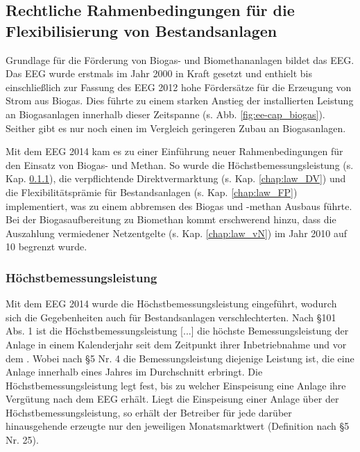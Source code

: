\subsection{Rechtliche Rahmenbedingungen für die Flexibilisierung von Bestandsanlagen}\label{chap:law_theo}

Grundlage für die Förderung von Biogas- und Biomethananlagen bildet das \gls{EEG}. Das \gls{EEG} wurde erstmals im Jahr 2000 in Kraft gesetzt und enthielt bis einschließlich zur Fassung des \gls{EEG} \SI{2012}{\relax} hohe Fördersätze für die Erzeugung von Strom aus Biogas. Dies führte zu einem starken Anstieg der installierten Leistung an Biogasanlagen innerhalb dieser Zeitspanne (s. Abb. \ref{fig:ee-cap_biogas}). Seither gibt es nur noch einen im Vergleich geringeren Zubau an Biogasanlagen. \parencite{DanielGromke2019}\smallskip

Mit dem \gls{EEG} \SI{2014}{\relax} kam es zu einer Einführung neuer Rahmenbedingungen für den Einsatz von Biogas- und Methan. So wurde die Höchstbemessungsleistung (s. Kap. \ref{chap:law_Bem}), die verpflichtende Direktvermarktung (s. Kap. \ref{chap:law_DV}) und die Flexibilitätsprämie für Bestandsanlagen (s. Kap. \ref{chap:law_FP}) implementiert, was zu einem abbremsen des Biogas und -methan Ausbaus führte. Bei der Biogasaufbereitung zu Biomethan kommt erschwerend hinzu, dass die Auszahlung vermiedener Netzentgelte (s. Kap. \ref{chap:law_vN}) im Jahr \SI{2010}{\relax} auf \SI{10}{\Jahre} begrenzt wurde. \parencite{BDEW2019a}


\subsubsection{Höchstbemessungsleistung}\label{chap:law_Bem}

Mit dem \gls{EEG} \SI{2014}{\relax} wurde die Höchstbemessungsleistung eingeführt, wodurch sich die Gegebenheiten auch für Bestandsanlagen verschlechterten. Nach \S 101 Abs. 1 ist die \glqq Höchstbemessungsleistung [...] die höchste Bemessungsleistung der Anlage in einem Kalenderjahr seit dem Zeitpunkt ihrer Inbetriebnahme und vor dem .\grqq{} Wobei nach \S 5 Nr. 4 die Bemessungsleistung diejenige Leistung ist, die eine Anlage innerhalb eines Jahres im Durchschnitt erbringt. \parencite{BJV2014a} Die Höchstbemessungsleistung legt fest, bis zu welcher Einspeisung eine Anlage ihre Vergütung nach dem \gls{EEG} erhält. Liegt die Einspeisung einer Anlage über der Höchstbemessungsleistung, so erhält der Betreiber für jede darüber hinausgehende erzeugte \si{\kwh} nur den jeweiligen Monatsmarktwert (Definition nach \S 5 Nr. 25). \parencite{Loibl2014}\smallskip

